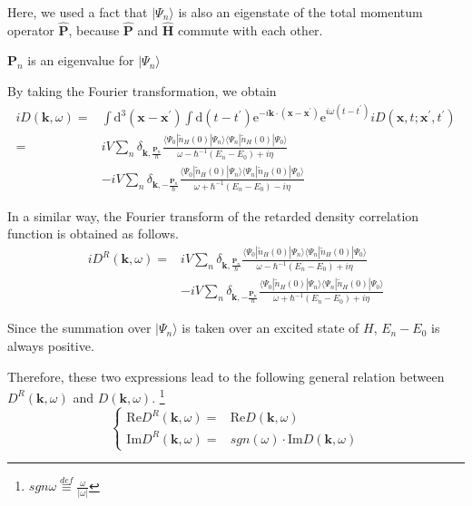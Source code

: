 Here, we used a fact that $|\Psi_n \rangle$ is also an eigenstate of the total momentum operator $\hat{\mathbf{P}}$, because $\hat{\mathbf{P}}$ and $\hat{\mathbf{H}}$ commute with each other.

$\mathbf{P}_n$ is an eigenvalue for $|\Psi_n \rangle$

By taking the Fourier transformation, we obtain
\begin{equation} \label{Eqs3.1.16} \begin{split}
i D(\mathbf{k},\omega) =& \int \mathrm{d}^3 (\mathbf{x}-\mathbf{x}^{'}) \int \mathrm{d} (t-t^{'}) \mathrm{e}^{-i \mathbf{k} \cdot (\mathbf{x}-\mathbf{x}^{'})}\mathrm{e}^{i \omega (t-t^{'})} i D(\mathbf{x},t;\mathbf{x}^{'},t^{'})\\
=& i V \sum_n \delta_{\mathbf{k},\frac{\mathbf{P}_n}{\hbar}}\frac{\langle \Psi_0 | \tilde{n}_H(0) | \Psi_n \rangle \langle \Psi_n | \tilde{n}_H(0) | \Psi_0 \rangle}{ \omega - \hbar^{-1}(E_n-E_0) + i \eta}\\
& -i V \sum_n \delta_{\mathbf{k},-\frac{\mathbf{P}_n}{\hbar}}\frac{\langle \Psi_0 | \tilde{n}_H(0) | \Psi_n \rangle \langle \Psi_n | \tilde{n}_H(0) | \Psi_0 \rangle}{ \omega + \hbar^{-1}(E_n-E_0) - i \eta}
\end{split} \end{equation}

In a similar way, the Fourier transform of the retarded density correlation function is obtained as follows.
\begin{equation} \label{Eqs3.1.17} \begin{split}
i D^R(\mathbf{k},\omega) =& i V \sum_n \delta_{\mathbf{k},\frac{\mathbf{P}_n}{\hbar}}\frac{\langle \Psi_0 | \tilde{n}_H(0) | \Psi_n \rangle \langle \Psi_n | \tilde{n}_H(0) | \Psi_0 \rangle}{ \omega - \hbar^{-1}(E_n-E_0) + i \eta}\\
& -i V \sum_n \delta_{\mathbf{k},-\frac{\mathbf{P}_n}{\hbar}}\frac{\langle \Psi_0 | \tilde{n}_H(0) | \Psi_n \rangle \langle \Psi_n | \tilde{n}_H(0) | \Psi_0 \rangle}{ \omega + \hbar^{-1}(E_n-E_0) + i \eta}
\end{split}\end{equation}

Since the summation over $|\Psi_n\rangle$ is taken over an excited state of $H$, $E_n-E_0$ is always positive.

Therefore, these two expressions lead to the following general relation between $D^R(\mathbf{k},\omega)$ and $D(\mathbf{k},\omega)$.
\footnote{$sgn \omega \overset{def}{\equiv} \frac{\omega}{|\omega|}$}
\begin{equation} \label{Eqs3.1.18} \left\{ \begin{aligned}
\text{Re} D^R(\mathbf{k},\omega) =& \text{Re} D(\mathbf{k},\omega)\\
\text{Im} D^R(\mathbf{k},\omega) =& sgn(\omega) \cdot \text{Im} D(\mathbf{k},\omega)
\end{aligned}\right.\end{equation}

